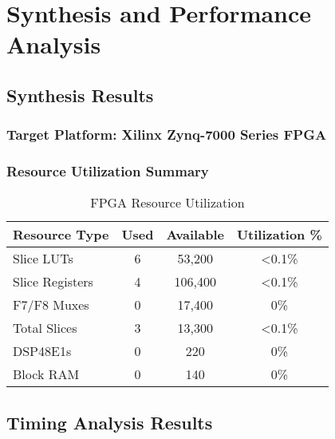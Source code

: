 \documentclass[12pt,letterpaper]{article}
\begin{document}
\newpage

\section{Synthesis and Performance Analysis}

\subsection{Synthesis Results}

\subsubsection{Target Platform: Xilinx Zynq-7000 Series FPGA}

\subsubsection{Resource Utilization Summary}
\begin{table}[H]
\centering
\caption{FPGA Resource Utilization}
\begin{tabular}{@{}lccc@{}}
\toprule
\textbf{Resource Type} & \textbf{Used} & \textbf{Available} & \textbf{Utilization \%} \\
\midrule
Slice LUTs & 6 & 53,200 & <0.1\% \\
Slice Registers & 4 & 106,400 & <0.1\% \\
F7/F8 Muxes & 0 & 17,400 & 0\% \\
Total Slices & 3 & 13,300 & <0.1\% \\
DSP48E1s & 0 & 220 & 0\% \\
Block RAM & 0 & 140 & 0\% \\
\bottomrule
\end{tabular}
\label{tab:resource_utilization}
\end{table}

\subsection{Timing Analysis Results}
\end{document}
